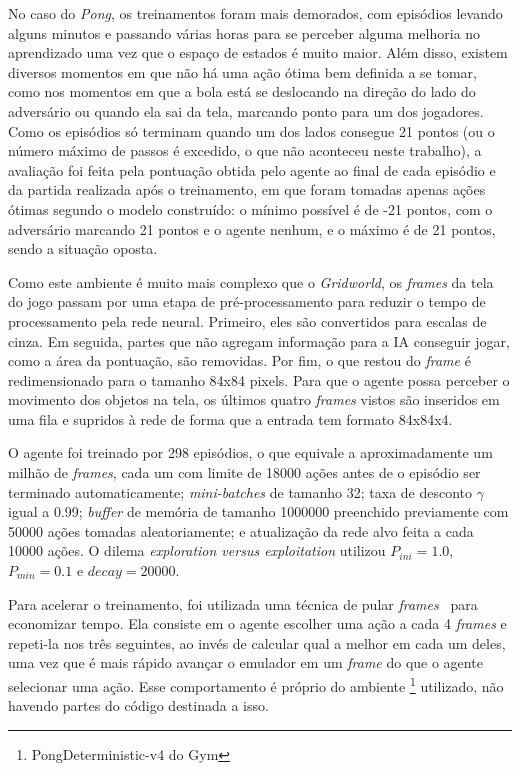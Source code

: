 No caso do \textit{Pong}, os treinamentos foram mais demorados, com episódios levando alguns minutos e passando várias horas para se perceber alguma melhoria no aprendizado uma vez que o espaço de estados é muito maior.
Além disso, existem diversos momentos em que não há uma ação ótima bem definida a se tomar, como nos momentos em que a bola está se deslocando na direção do lado do adversário ou quando ela sai da tela, marcando ponto para um dos jogadores.
Como os episódios só terminam quando um dos lados consegue 21 pontos (ou o número máximo de passos é excedido, o que não aconteceu neste trabalho), a avaliação foi feita pela pontuação obtida pelo agente ao final de cada episódio e da partida realizada após o treinamento, em que foram tomadas apenas ações ótimas segundo o modelo construído:
o mínimo possível é de -21 pontos, com o adversário marcando 21 pontos e o agente nenhum, e o máximo é de 21 pontos, sendo a situação oposta.

Como este ambiente é muito mais complexo que o \textit{Gridworld}, os \textit{frames} da tela do jogo passam por uma etapa de pré-processamento para reduzir o tempo de processamento pela rede neural.
Primeiro, eles são convertidos para escalas de cinza.
Em seguida, partes que não agregam informação para a IA conseguir jogar, como a área da pontuação, são removidas.
Por fim, o que restou do \textit{frame} é redimensionado para o tamanho 84x84 pixels.
Para que o agente possa perceber o movimento dos objetos na tela, os últimos quatro \textit{frames} vistos são inseridos em uma fila e supridos à rede de forma que a entrada tem formato 84x84x4.

O agente foi treinado por 298 episódios, o que equivale a aproximadamente um milhão de \textit{frames}, cada um com limite de 18000 ações antes de o episódio ser terminado automaticamente;
\textit{mini-batches} de tamanho 32; taxa de desconto $\gamma$ igual a 0.99;
\textit{buffer} de memória de tamanho 1000000 preenchido previamente com 50000 ações tomadas aleatoriamente;
e atualização da rede alvo feita a cada 10000 ações.
O dilema \textit{exploration versus exploitation} utilizou $P_{ini} = 1.0$, $P_{min} = 0.1$ e $decay = 20000$.

Para acelerar o treinamento, foi utilizada uma técnica de pular \textit{frames}~\cite{DBLP:journals/corr/abs-1207-4708} para economizar tempo.
Ela consiste em o agente escolher uma ação a cada 4 \textit{frames} e repeti-la nos três seguintes, ao invés de calcular qual a melhor em cada um deles, uma vez que é mais rápido avançar o emulador em um \textit{frame} do que o agente selecionar uma ação.
Esse comportamento é próprio do ambiente \footnote{PongDeterministic-v4 do Gym} utilizado, não havendo partes do código destinada a isso.

